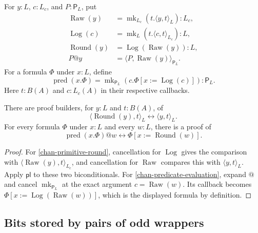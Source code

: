 \begin{definition}
\label{chan-raw-log}
For $y:L$, $c:L_c$, and $P:\mathsf P_L$, put
\[
\begin{aligned}
 \operatorname{Raw}(y)
   &=\operatorname{mk}_{L_c}(t.\langle y,t\rangle_L):L_c,\\
 \operatorname{Log}(c)
   &=\operatorname{mk}_{L}(t.\langle c,t\rangle_{L_c}):L,\\
 \operatorname{Round}(y)&=\operatorname{Log}(\operatorname{Raw}(y)):L,\\
 P@y&=\langle P,\operatorname{Raw}(y)\rangle_{\mathsf P_L}.
\end{aligned}
\]
For a formula $\Phi$ under $x:L$, define
\[
 \operatorname{pred}(x.\Phi)
   =\operatorname{mk}_{\mathsf P_L}
       (c.\Phi[x:=\operatorname{Log}(c)]):\mathsf P_L.
\]
Here $t:B(A)$ and $c:L_c(A)$ in their respective callbacks.
\end{definition}

\begin{lemma}
\label{chan-rounding}
There are proof builders, for $y:L$ and $t:B(A)$, of
\begin{equation}
 \langle\operatorname{Round}(y),t\rangle_L
       \leftrightarrow\langle y,t\rangle_L.
\label{chan-primitive-round}
\end{equation}
For every formula $\Phi$ under $x:L$ and every $w:L$, there is a proof of
\begin{equation}
 \operatorname{pred}(x.\Phi)@w
       \leftrightarrow\Phi[x:=\operatorname{Round}(w)].
\label{chan-predicate-evaluation}
\end{equation}
\end{lemma}

\begin{proof}
For \eqref{chan-primitive-round}, cancellation for $\operatorname{Log}$
gives the comparison with
$\langle\operatorname{Raw}(y),t\rangle_{L_c}$, and cancellation for
$\operatorname{Raw}$ compares this with $\langle y,t\rangle_L$.
Apply $\mathsf{pl}$ to these two biconditionals.  For
\eqref{chan-predicate-evaluation}, expand $@$ and cancel
$\operatorname{mk}_{\mathsf P_L}$ at the exact argument
$c=\operatorname{Raw}(w)$.  Its callback becomes
$\Phi[x:=\operatorname{Log}(\operatorname{Raw}(w))]$, which is the
displayed formula by definition.
\end{proof}

\subsection{Bits stored by pairs of odd wrappers}

